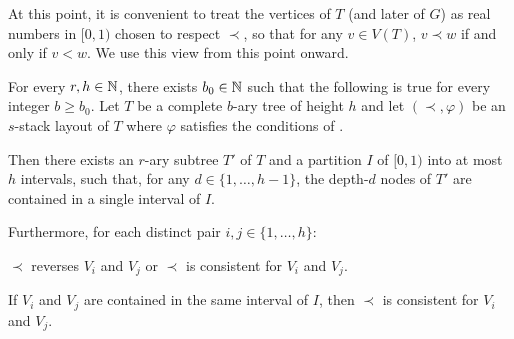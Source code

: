 \documentclass[kpfonts]{patmorin}
\begin{document}
% 

At this point, it is convenient to treat the vertices of $T$ (and later of $G$) as real numbers in $[0,1)$ chosen to respect $\prec$, so that for any $v\in V(T)$, $v\prec w$ if and only if $v < w$.  We use this view from this point onward.

\begin{lem}
  For every $r,h\in\mathbb{N}$, there exists $b_0\in\mathbb{N}$ such that the following is true for every integer $b\ge b_0$.  Let $T$ be a complete $b$-ary tree of height $h$ and let $(\prec,\varphi)$ be an $s$-stack layout of $T$ where $\varphi$ satisfies the conditions of .  
  
  Then there exists an $r$-ary subtree $T'$ of $T$ and a partition $I$ of $[0,1)$ into at most $h$ intervals, such that, for any $d\in\{1,\ldots,h-1\}$, the depth-$d$ nodes of $T'$ are contained in a single interval of $I$.
  
  Furthermore, for each distinct pair $i,j\in\{1,\ldots,h\}$:
  \begin{compactenum}[(O1)]
    \item $\prec$ reverses $V_i$ and $V_j$ or $\prec$ is consistent for $V_i$ and $V_j$.
    \item If $V_i$ and $V_j$ are contained in the same interval of $I$, then $\prec$ is consistent for $V_i$ and $V_j$.
  \end{compactenum}
\end{lem}
\end{document}
